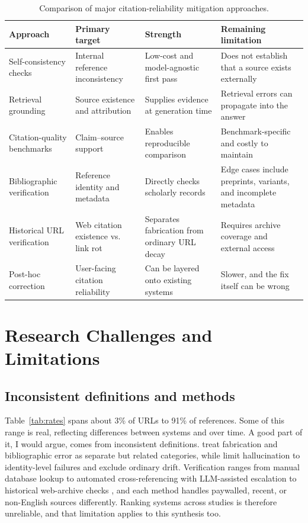 \documentclass[acmsmall,screen]{acmart}
\begin{document}
\begin{table}[t]
\centering
\caption{Comparison of major citation-reliability mitigation approaches.}
\label{tab:mitigation}
\small
\begin{tabularx}{\linewidth}{P{2.4cm} P{3.0cm} Y Y}
\toprule
\textbf{Approach} & \textbf{Primary target} & \textbf{Strength} & \textbf{Remaining limitation}\\
\midrule
Self-consistency checks & Internal reference inconsistency & Low-cost and model-agnostic first pass & Does not establish that a source exists externally\\
Retrieval grounding & Source existence and attribution & Supplies evidence at generation time & Retrieval errors can propagate into the answer\\
Citation-quality benchmarks & Claim--source support & Enables reproducible comparison & Benchmark-specific and costly to maintain\\
Bibliographic verification & Reference identity and metadata & Directly checks scholarly records & Edge cases include preprints, variants, and incomplete metadata\\
Historical URL verification & Web citation existence vs. link rot & Separates fabrication from ordinary URL decay & Requires archive coverage and external access\\
Post-hoc correction & User-facing citation reliability & Can be layered onto existing systems & Slower, and the fix itself can be wrong\\
\bottomrule
\end{tabularx}
\end{table}

\section{Research Challenges and Limitations}\label{sec:challenges}
\subsection{Inconsistent definitions and methods}\label{sec:definitions}
Table~\ref{tab:rates} spans about 3\% of URLs to 91\% of references. Some of this range is real, reflecting differences between systems and over time. A good part of it, I would argue, comes from inconsistent definitions. \citet{walters2023} treat fabrication and bibliographic error as separate but related categories, while \citet{russinovich2026b} limit hallucination to identity-level failures and exclude ordinary drift. Verification ranges from manual database lookup \citep{bhattacharyya2023} to automated cross-referencing with LLM-assisted escalation \citep{russinovich2026b} to historical web-archive checks \citep{rao2026}, and each method handles paywalled, recent, or non-English sources differently. Ranking systems across studies is therefore unreliable, and that limitation applies to this synthesis too.
\end{document}
